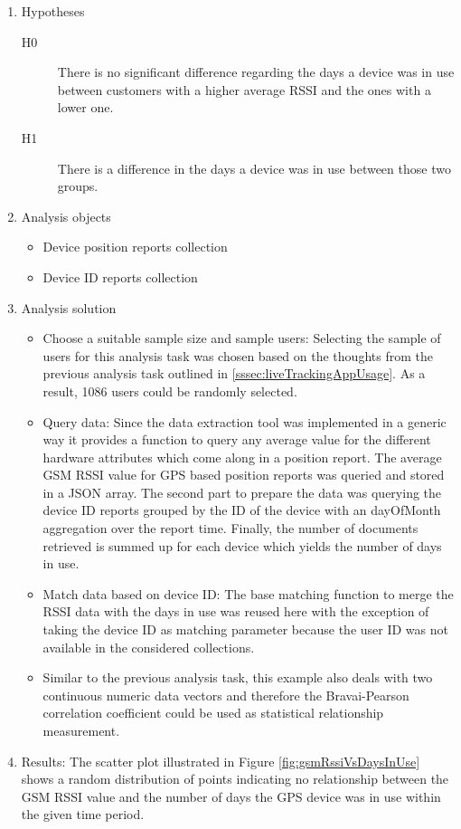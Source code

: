 \begin{enumerate}
	\item Hypotheses
	\begin{description}
		\item[H0] There is no significant difference regarding the days a device was in use between customers with a higher average RSSI and the ones with a lower one.
		\item [H1] There is a difference in the days a device was in use between those two groups. 
	\end{description}
	\item Analysis objects
	\begin{itemize}
		\item Device position reports collection
		\item Device ID reports collection
	\end{itemize}
	\item Analysis solution
	\begin{itemize}
		\item Choose a suitable sample size and sample users: Selecting the sample of users for this analysis task was chosen based on the thoughts from the previous analysis task outlined in \ref{sssec:liveTrackingAppUsage}. As a result, 1086 users could be randomly selected.
		\item Query data: Since the data extraction tool was implemented in a generic way it provides a function to query any average value for the different hardware attributes which come along in a position report. The average GSM RSSI value for GPS based position reports was queried and stored in a JSON array. The second part to prepare the data was querying the device ID reports grouped by the ID of the device with an dayOfMonth aggregation over the report time. Finally, the number of documents retrieved is summed up for each device which yields the number of days in use.  
		\item Match data based on device ID: The base matching function to merge the RSSI data with the days in use was reused here with the exception of taking the device ID as matching parameter because the user ID was not available in the considered collections. 
		\item Similar to the previous analysis task, this example also deals with two continuous numeric data vectors and therefore the Bravai-Pearson correlation coefficient could be used as statistical relationship measurement. 
	\end{itemize}
	\item Results: The scatter plot illustrated in Figure \ref{fig:gsmRssiVsDaysInUse} shows a random distribution of points indicating no relationship between the GSM RSSI value and the number of days the GPS device was in use within the given time period. 
	

\end{enumerate}
